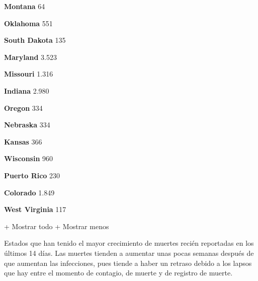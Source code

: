 \textbf{Montana} 64

\href{https://www.nytimes3xbfgragh.onion/interactive/2020/us/oklahoma-coronavirus-cases.html}{}

\textbf{Oklahoma} 551

\href{https://www.nytimes3xbfgragh.onion/interactive/2020/us/south-dakota-coronavirus-cases.html}{}

\textbf{South Dakota} 135

\href{https://www.nytimes3xbfgragh.onion/interactive/2020/us/maryland-coronavirus-cases.html}{}

\textbf{Maryland} 3.523

\href{https://www.nytimes3xbfgragh.onion/interactive/2020/us/missouri-coronavirus-cases.html}{}

\textbf{Missouri} 1.316

\href{https://www.nytimes3xbfgragh.onion/interactive/2020/us/indiana-coronavirus-cases.html}{}

\textbf{Indiana} 2.980

\href{https://www.nytimes3xbfgragh.onion/interactive/2020/us/oregon-coronavirus-cases.html}{}

\textbf{Oregon} 334

\href{https://www.nytimes3xbfgragh.onion/interactive/2020/us/nebraska-coronavirus-cases.html}{}

\textbf{Nebraska} 334

\href{https://www.nytimes3xbfgragh.onion/interactive/2020/us/kansas-coronavirus-cases.html}{}

\textbf{Kansas} 366

\href{https://www.nytimes3xbfgragh.onion/interactive/2020/us/wisconsin-coronavirus-cases.html}{}

\textbf{Wisconsin} 960

\href{https://www.nytimes3xbfgragh.onion/interactive/2020/us/puerto-rico-coronavirus-cases.html}{}

\textbf{Puerto Rico} 230

\href{https://www.nytimes3xbfgragh.onion/interactive/2020/us/colorado-coronavirus-cases.html}{}

\textbf{Colorado} 1.849

\href{https://www.nytimes3xbfgragh.onion/interactive/2020/us/west-virginia-coronavirus-cases.html}{}

\textbf{West Virginia} 117

+ Mostrar todo + Mostrar menos

Estados que han tenido el mayor crecimiento de muertes recién reportadas
en los últimos 14 días. Las muertes tienden a aumentar unas pocas
semanas después de que aumentan las infecciones, pues tiende a haber un
retraso debido a los lapsos que hay entre el momento de contagio, de
muerte y de registro de muerte.

